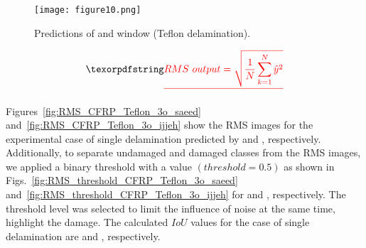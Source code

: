 \begin{figure}[!h]
	\centering
	\DIFdelbeginFL %
\DIFdelendFL \DIFaddbeginFL \texttt{[image: figure10.png]}
	\DIFaddendFL \caption{Predictions of \DIFdelbeginFL {}\DIFdelendFL \DIFaddbeginFL {}\DIFaddendFL {} and \DIFaddbeginFL {}\DIFaddendFL {} \DIFdelbeginFL {}\DIFdelendFL \DIFaddbeginFL {}\DIFaddendFL window \DIFdelbeginFL {}\DIFdelendFL \DIFaddbeginFL {}\DIFaddendFL (Teflon \DIFdelbeginFL {}\DIFdelendFL \DIFaddbeginFL {}\DIFaddendFL delamination).}
	\label{fig:CFRP_Teflon_3o_predictions}
\end{figure}

\DIFdelbegin {}\begin{displaymath}
	\DIFdel{RMS\ output = \sqrt{\frac{1}{N}\sum_{k=1}^{N}\hat{y}^2}	
}\end{displaymath}%

\DIFdelend Figures~\ref{fig:RMS_CFRP_Teflon_3o_saeed} and~\ref{fig:RMS_CFRP_Teflon_3o_ijjeh} show the RMS images for the experimental case of single delamination predicted by \DIFdelbegin {}\DIFdelend \DIFaddbegin {}\DIFaddend {} and \DIFdelbegin {}\DIFdelend \DIFaddbegin {}\DIFaddend {}, respectively.
Additionally, to separate undamaged and damaged classes from the RMS images, we applied a binary threshold with a value \((threshold=0.5)\) as shown in Figs.~\ref{fig:RMS_threshold_CFRP_Teflon_3o_saeed} and~\ref{fig:RMS_threshold_CFRP_Teflon_3o_ijjeh} for \DIFdelbegin {}\DIFdelend \DIFaddbegin {}\DIFaddend {} and \DIFdelbegin {}\DIFdelend \DIFaddbegin {}\DIFaddend {}, respectively. 
The threshold level was selected to limit the influence of noise \DIFdelbegin {}\DIFdelend \DIFaddbegin {}\DIFaddend at the same time, highlight the damage.
The calculated \(IoU\) values for the case of single delamination are \DIFdelbegin {}\DIFdelend \DIFaddbegin {}\DIFaddend {} and \DIFdelbegin {}\DIFdelend \DIFaddbegin {}\DIFaddend {}, respectively.
\DIFaddbegin 

